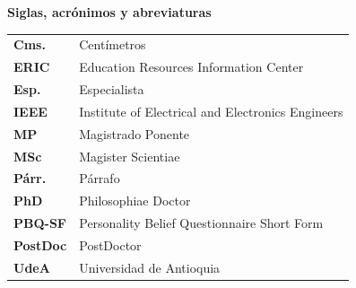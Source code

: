 \pagestyle{empty}


    
\begin{center}
    \textbf{Siglas, acrónimos y abreviaturas}
\end{center}


\begin{tabular}{m{2cm}p{10cm}}
    \textbf{Cms.}	    &	Centímetros\\
    \textbf{ERIC}	    &	Education Resources Information Center\\
    \textbf{Esp.}	    &	Especialista\\
    \textbf{IEEE}		&	Institute of Electrical and Electronics Engineers \\
    \textbf{MP}		    &	Magistrado Ponente\\
    \textbf{MSc}		&	Magister Scientiae\\
    \textbf{Párr.}	    &	Párrafo\\
    \textbf{PhD}		&	Philosophiae Doctor\\
    \textbf{PBQ-SF} 	&	Personality Belief Questionnaire Short Form\\
    \textbf{PostDoc}	&	PostDoctor\\
    \textbf{UdeA}	    &	Universidad de Antioquia
\end{tabular}